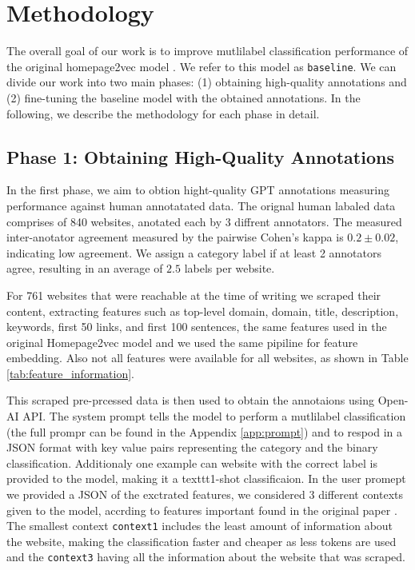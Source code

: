 \section{Methodology}\label{sec:methods}
The overall goal of our work is to improve mutlilabel classification performance of the original homepage2vec model \cite{homepage2vec}. 
We refer to this model as \texttt{baseline}. 
We can divide our work into two main phases: (1) obtaining high-quality annotations and (2) fine-tuning the baseline model with the obtained annotations. 
In the following, we describe the methodology for each phase in detail.

\subsection* {Phase 1: Obtaining High-Quality Annotations}
In the first phase, we aim to obtion hight-quality GPT annotations measuring performance against human annotatated data.
The orignal human labaled data comprises of 840 websites, anotated each by 3 diffrent annotators. 
The measured inter-anotator agreement measured by the pairwise Cohen's kappa \cite{cohen-coef} is $0.2 \pm 0.02$, indicating low agreement. 
We assign a category label if at least 2 annotators agree, resulting in an average of $2.5$ labels per website.

For 761 websites that were reachable at the time of writing we scraped their content, extracting features such as top-level domain, domain, title, description, keywords, first 50 links, and first 100 sentences, the same features used in the original Homepage2vec model \cite{homepage2vec} and we used the same pipiline for feature embedding.
Also not all features were available for all websites, as shown in Table \ref{tab:feature_information}.


This scraped pre-prcessed data is then used to obtain the annotaions using Open-AI API.
The system prompt tells the model to perform a mutlilabel classification (the full prompr can be found in the Appendix \ref{app:prompt}) and to respod in a JSON format with key value pairs representing the category and the binary classification. Additionaly one example can website with the correct label is provided to the model, making it a texttt{1-shot} classificaion.
In the user promept we provided a JSON of the exctrated features, we considered 3 different contexts given to the model, accrding to features important found in the original paper \cite{homepage2vec}. 
The smallest context \texttt{context1} includes the least amount of information about the website, making the classification faster and cheaper as less tokens are used and the \texttt{context3} having all the information about the website that was scraped.

